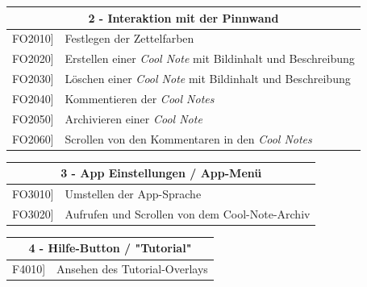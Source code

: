 \documentclass[a4paper]{scrreprt}
\begin{document}
    		\vspace{5mm}
    		
    		\begin{table}[h!]
    			\centering
    			\label{my-label}
    			\begin{tabular}{p{2cm}p{12cm}}
    				
    				\multicolumn{2}{c}{\textbf{2 - Interaktion mit der Pinnwand}} \\ \hline
    				\centering{[}FO2010{]} & Festlegen der Zettelfarben\\
    				\centering{[}FO2020{]}& Erstellen einer \textit{Cool Note} mit Bildinhalt und Beschreibung                              \\
    				\centering{[}FO2030{]}& Löschen einer \textit{Cool Note} mit Bildinhalt und Beschreibung\\ 
    				\centering{[}FO2040{]}& Kommentieren der \textit{Cool Notes}\\ 
    				\centering{[}FO2050{]}& Archivieren einer \textit{Cool Note}\\ 
    				\centering{[}FO2060{]}& Scrollen von den Kommentaren in den \textit{Cool Notes}\\ 
    				\hline
    			\end{tabular}
    		\end{table}
    		
    		\vspace{5mm}
    		
    		\begin{table}[h!]
    			\centering
    			\label{my-label}
    			\begin{tabular}{p{2cm}p{12cm}}
    				
    				\multicolumn{2}{c}{\textbf{3 - App Einstellungen / App-Menü}} \\ \hline
    				\centering{[}FO3010{]} & Umstellen der App-Sprache\\
    				\centering{[}FO3020{]} & Aufrufen und Scrollen von dem Cool-Note-Archiv\\
    				\hline
    			\end{tabular}
    		\end{table}
    		
    		\vspace{5mm}
    		
    		\begin{table}[h!]
    			\centering
    			\label{my-label}
    			\begin{tabular}{p{2cm}p{12cm}}
    				
    				\multicolumn{2}{c}{\textbf{4 - Hilfe-Button / "Tutorial"}} \\ \hline
    				\centering{[}F4010{]} & Ansehen des Tutorial-Overlays\\    				
    				\hline
    			\end{tabular}
    		\end{table}
    		
\end{document}
